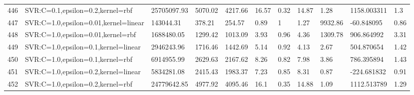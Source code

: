 \begin{longtable}{C{0.8cm} L{2cm} C{1.15cm} C{1.15cm} C{1.15cm} C{1.15cm} C{0.85cm} C{1.25cm} C{1.2cm} C{1.5cm} C{1.0cm}}
446 & SVR:\newline C=0.1,\newline epsilon=0.2,\newline kernel=rbf & 25705097.93 & 5070.02 & 4217.66 & 16.57 & 0.32 & 14.87 & 1.28 & 1158.003311 & 1.3 \\
447 & SVR:\newline C=1.0,\newline epsilon=0.01,\newline kernel=linear & 143044.31 & 378.21 & 254.57 & 0.89 & 1 & 1.27 & 9932.86 & -60.848095 & 0.86 \\
448 & SVR:\newline C=1.0,\newline epsilon=0.01,\newline kernel=rbf & 1688480.05 & 1299.42 & 1013.09 & 3.93 & 0.96 & 4.36 & 1309.78 & 906.864992 & 3.31 \\
449 & SVR:\newline C=1.0,\newline epsilon=0.1,\newline kernel=linear & 2946243.96 & 1716.46 & 1442.69 & 5.14 & 0.92 & 4.13 & 2.67 & 504.870654 & 1.42 \\
450 & SVR:\newline C=1.0,\newline epsilon=0.1,\newline kernel=rbf & 6914955.99 & 2629.63 & 2167.62 & 8.26 & 0.82 & 7.98 & 3.86 & 786.395894 & 1.43 \\
451 & SVR:\newline C=1.0,\newline epsilon=0.2,\newline kernel=linear & 5834281.08 & 2415.43 & 1983.37 & 7.23 & 0.85 & 8.31 & 0.87 & -224.681832 & 0.91 \\
452 & SVR:\newline C=1.0,\newline epsilon=0.2,\newline kernel=rbf & 24779642.85 & 4977.92 & 4095.46 & 16.1 & 0.35 & 14.88 & 1.09 & 1112.513789 & 1.29 \\
\end{longtable}
\endgroup


